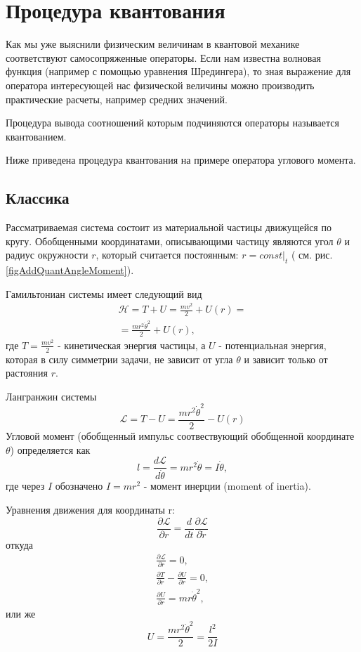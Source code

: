 \section{Процедура квантования}
Как мы уже выяснили физическим величинам в квантовой механике
соответствуют самосопряженные операторы. Если нам известна волновая
функция (например с помощью уравнения Шредингера), то зная выражение
для оператора интересующей нас физической величины можно производить
практические расчеты, например средних значений.

Процедура вывода соотношений которым подчиняются операторы называется
квантованием. 

Ниже приведена процедура квантования на примере оператора углового
момента.


 
\subsection{Классика}
Рассматриваемая система состоит из материальной частицы движущейся по
кругу. Обобщенными координатами, описывающими частицу являются угол
$\theta$ и радиус окружности $r$, который считается постоянным: $r =
\left. const \right|_t$ ( см. рис. \ref{figAddQuantAngleMoment}).

Гамильтониан системы имеет следующий вид 
\begin{eqnarray}
\mathcal{H} = T + U = \frac{m v^2}{2} + U\left( r \right) = 
\nonumber \\
= \frac{m r^2 \dot{\theta}^2 }{2} + U\left( r \right),
\nonumber
\end{eqnarray}
где $T = \frac{m v^2}{2}$ - кинетическая энергия частицы, 
а $U$ - потенциальная энергия, которая в силу симметрии задачи, не
зависит от угла $\theta$ и зависит только от растояния $r$.

Лангранжин системы
\[
\mathcal{L} = T - U = \frac{m r^2 \dot{\theta}^2 }{2} - U\left( r \right)
\]
Угловой момент (обобщенный импульс соотвествующий обобщенной
координате $\theta$) определяется как 
\begin{equation}
l = \frac{d \mathcal{L}}{d \dot{\theta}} = 
m r^2 \dot{\theta} = I \dot{\theta},
\label{eqAngualrMomentumClass}
\end{equation}
где через $I$ обозначено $I = m r^2$ - момент инерции (moment of
inertia).

Уравнения движения для координаты r:
\[
\frac{ \partial \mathcal{L} }{\partial r} = 
\frac{d}{d t} \frac{\partial \mathcal{L}}{\partial \dot{r}}
\]
 откуда
\begin{eqnarray}
\frac{ \partial \mathcal{L} }{\partial r} = 0,
\nonumber \\
\frac{ \partial T }{\partial r} - \frac{ \partial U }{\partial r} = 0,
\nonumber \\
\frac{\partial U}{\partial r} = m r \dot{\theta}^2,
\nonumber
\end{eqnarray}
 или же
\[
 U = \frac{m r^2 \dot{\theta}^2}{2} = \frac{l^2}{2 I}
\]
 
